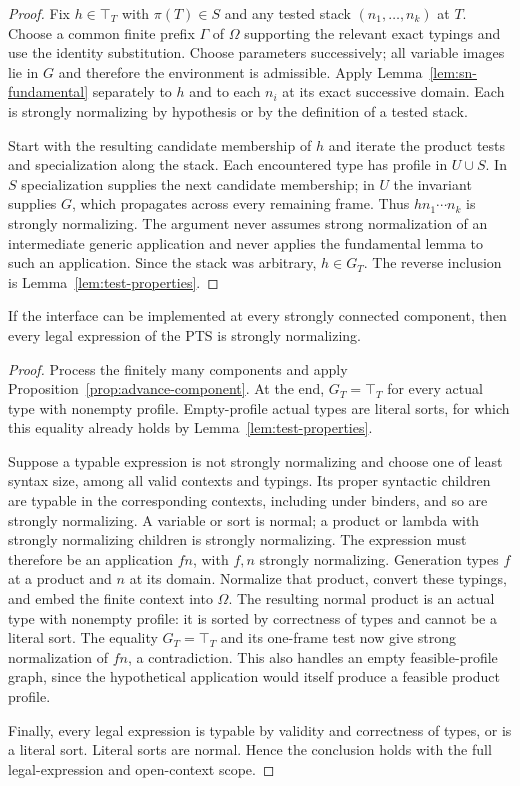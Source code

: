 \begin{proof}
Fix $h\in\top_T$ with $\pi(T)\in S$ and any tested stack
$(n_1,\ldots,n_k)$ at $T$. Choose a common finite prefix $\Gamma$
of $\Omega$ supporting the relevant exact typings and use the
identity substitution. Choose parameters successively; all variable
images lie in $G$ and therefore the environment is admissible.
Apply Lemma~\ref{lem:sn-fundamental} separately to $h$ and to each
$n_i$ at its exact successive domain. Each is strongly normalizing
by hypothesis or by the definition of a tested stack.

Start with the resulting candidate membership of $h$ and iterate the
product tests and specialization along the stack. Each encountered
type has profile in $U\cup S$. In $S$ specialization supplies the
next candidate membership; in $U$ the invariant supplies $G$, which
propagates across every remaining frame. Thus $h n_1\cdots n_k$ is
strongly normalizing. The argument never assumes strong normalization
of an intermediate generic application and never applies the
fundamental lemma to such an application. Since the stack was
arbitrary, $h\in G_T$. The reverse inclusion is
Lemma~\ref{lem:test-properties}.
\end{proof}

\begin{proposition}
\label{prop:interfaces-imply-sn}
If the interface can be implemented at every strongly connected
component, then every legal expression of the PTS is strongly
normalizing.
\end{proposition}

\begin{proof}
Process the finitely many components and apply
Proposition~\ref{prop:advance-component}. At the end, $G_T=\top_T$
for every actual type with nonempty profile. Empty-profile actual
types are literal sorts, for which this equality already holds by
Lemma~\ref{lem:test-properties}.

Suppose a typable expression is not strongly normalizing and choose
one of least syntax size, among all valid contexts and typings. Its
proper syntactic children are typable in the corresponding contexts,
including under binders, and so are strongly normalizing. A variable
or sort is normal; a product or lambda with strongly normalizing
children is strongly normalizing. The expression must therefore be
an application $f n$, with $f,n$ strongly normalizing. Generation
types $f$ at a product and $n$ at its domain. Normalize that product,
convert these typings, and embed the finite context into $\Omega$.
The resulting normal product is an actual type with nonempty profile:
it is sorted by correctness of types and cannot be a literal sort.
The equality $G_T=\top_T$ and its one-frame test now give strong
normalization of $f n$, a contradiction. This also handles an empty
feasible-profile graph, since the hypothetical application would
itself produce a feasible product profile.

Finally, every legal expression is typable by validity and correctness
of types, or is a literal sort. Literal sorts are normal. Hence the
conclusion holds with the full legal-expression and open-context scope.
\end{proof}

